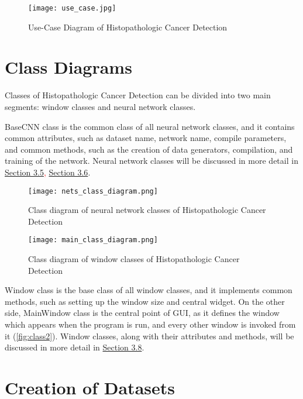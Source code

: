 \begin{figure}[h]
	\centering
	\texttt{[image: use\_case.jpg]}
	\caption{Use-Case Diagram of Histopathologic Cancer Detection}
	\label{fig:usecase}
\end{figure}

\section{Class Diagrams}

Classes of Histopathologic Cancer Detection can be divided into two main segments: window classes and neural network classes.

BaseCNN class is the common class of all neural network classes, and it contains common attributes, such as dataset name, network name, compile parameters, and common methods, such as the creation of data generators, compilation, and training of the network. Neural network classes will be discussed in more detail in \textcolor{red}{\hyperref[cnn]{Section 3.5}, \hyperref[vgg19]{Section 3.6}}.

\begin{figure}[h]
	\centering
	\texttt{[image: nets\_class\_diagram.png]}
	\caption{Class diagram of neural network classes of Histopathologic Cancer Detection}
	\label{fig:class1}
\end{figure}

\begin{figure}
	\centering
	\texttt{[image: main\_class\_diagram.png]}
	\caption{Class diagram of window classes of Histopathologic Cancer Detection}
	\label{fig:class2}
\end{figure}

Window class is the base class of all window classes, and it implements common methods, such as setting up the window size and central widget. On the other side, MainWindow class is the central point of GUI, as it defines the window which appears when the program is run, and every other window is invoked from it (\textcolor{red}{\autoref{fig:class2}}). Window classes, along with their attributes and methods, will be discussed in more detail in \textcolor{red}{\hyperref[gui]{Section 3.8}}.

\section{Creation of Datasets}
\label{createdata}

